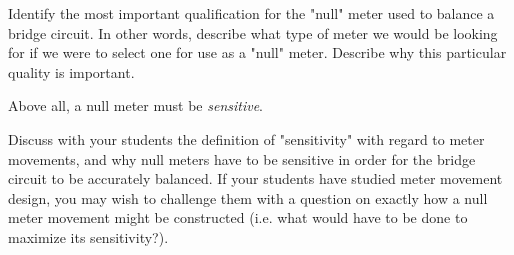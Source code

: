 

Identify the most important qualification for the "null" meter used to balance a bridge circuit.  In other words, describe what type of meter we would be looking for if we were to select one for use as a "null" meter.  Describe why this particular quality is important.







Above all, a null meter must be {\it sensitive}.







Discuss with your students the definition of "sensitivity" with regard to meter movements, and why null meters have to be sensitive in order for the bridge circuit to be accurately balanced.  If your students have studied meter movement design, you may wish to challenge them with a question on exactly how a null meter movement might be constructed (i.e. what would have to be done to maximize its sensitivity?).  




